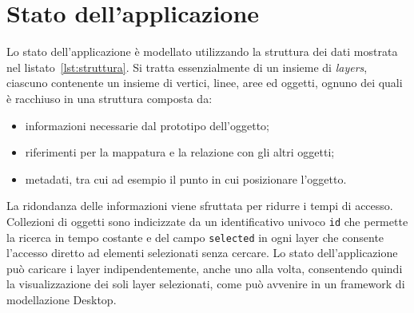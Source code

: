 \section{Stato dell'applicazione}
\label{sec:chapter_2_section_4}

Lo stato dell'applicazione è modellato utilizzando la struttura dei dati mostrata nel listato~\ref{lst:struttura}.
Si tratta essenzialmente di un insieme di \emph{layers}, ciascuno contenente un insieme di vertici, linee, aree
ed oggetti, ognuno dei quali è racchiuso in una struttura composta da:
\begin{itemize}
\item informazioni necessarie dal prototipo dell'oggetto;
\item riferimenti per la mappatura e la relazione con gli altri oggetti;
\item metadati, tra cui ad esempio il punto in cui posizionare l'oggetto.
\end{itemize}

La ridondanza delle informazioni viene sfruttata per ridurre i tempi di accesso. Collezioni di oggetti
sono indicizzate da un identificativo univoco \texttt{id} che permette la ricerca in tempo costante e del
campo \texttt{selected} in ogni layer che consente l'accesso diretto ad elementi selezionati senza cercare.
Lo stato dell'applicazione può caricare i layer indipendentemente, anche uno alla volta, consentendo quindi
la visualizzazione dei soli layer selezionati, come può avvenire in un framework di modellazione Desktop.\\

\newpage



